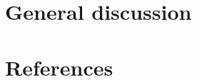 \documentclass[
]{article}
\begin{document}
\begin{figure}


\caption{\label{fig-coefs}}

\end{figure}%

\section{General discussion}\label{general-discussion}

\section{References}\label{references}
\end{document}
